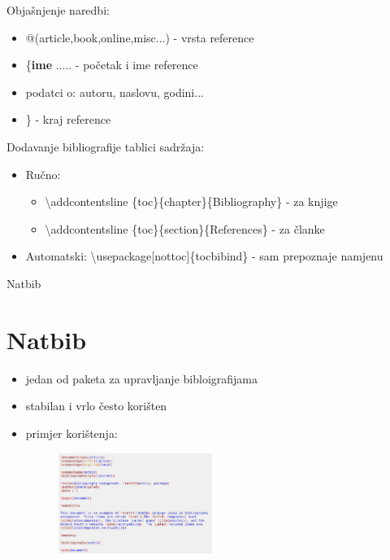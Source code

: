 \documentclass{beamer}
\begin{document}
\begin{frame}
Objašnjenje naredbi:
\begin{itemize}
    \item @(article,book,online,misc...) - vrsta reference \\
    \item \{\textbf{ime} ..... - početak i ime reference \\
    \item podatci o: autoru, naslovu, godini... \\
    \item \} - kraj reference
\end{itemize}
Dodavanje bibliografije tablici sadržaja:
\begin{itemize}
    \item Ručno: \\
    \begin{itemize}
        \item \textbackslash addcontentsline \{toc\}\{chapter\}\{Bibliography\} - za knjige \\
        \item \textbackslash addcontentsline \{toc\}\{section\}\{References\} - za članke \\
    \end{itemize}
    \item Automatski: \textbackslash usepackage[nottoc]\{tocbibind\} - sam prepoznaje namjenu\\
\end{itemize}
\end{frame}

\begin{frame}{Natbib\cite{natbib}}
\section{Natbib}
\begin{itemize}
	\item jedan od paketa za upravljanje bibloigrafijama \\
	\item stabilan i vrlo često korišten \\
	\item primjer korištenja: \\ 
	\begin{figure}
	\includegraphics[width=5cm]{natbibprimjer.png}
	\end{figure}
\end{itemize}
\end{frame}
\end{document}
